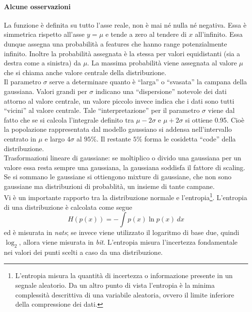 \paragraph{Alcune osservazioni}
La funzione è definita su tutto l’asse reale, non è mai né nulla né negativa. Essa è simmetrica rispetto all’asse $y=\mu$  e tende a zero al tendere di $x$ all’infinito. Essa dunque assegna una probabilità a features che hanno range potenzialmente infinito. Inoltre la probabilità assegnata è la stessa per valori equidistanti (sia a destra come a sinistra) da $\mu$. La massima probabilità viene assegnata al valore $\mu$ che si chiama anche valore centrale della distribuzione.\\
Il parametro $\sigma$ serve a determinare quanto è “larga” o “svasata” la campana della gaussiana. Valori grandi per $\sigma$ indicano una “dispersione” notevole dei dati attorno al valore centrale, un valore piccolo invece indica che i dati sono tutti “vicini” al valore centrale. Tale “interpretazione” per il parametro $\sigma$ viene dal fatto che se si calcola l’integrale definito tra $\mu - 2\sigma$ e $\mu + 2\sigma$ si ottiene 0.95. Cioè la popolazione rappresentata dal modello gaussiano si addensa nell’intervallo centrato in $\mu$ e largo $4\sigma$ al $95\%$. Il restante $5\%$ forma le cosidetta “code” della distribuzione.\\

\noindent Trasformazioni lineare di gaussiane: se moltiplico o divido una gaussiana per un valore essa resta sempre una gaussiana, la gaussiana soddisfa il fattore di scaling. Se si sommano le gaussiane si ottiengono mixture di gaussiane, che non sono gaussiane ma distribuzioni di probablità, un insieme di tante campane.\\ 

\noindent Vi è un importante rapporto tra la distribuzione normale e l'entropia\footnote{L'entropia misura la quantità di incertezza o informazione presente in un segnale aleatorio. Da un altro punto di vista l'entropia è la minima complessità descrittiva di una variabile aleatoria, ovvero il limite inferiore della compressione dei dati.}. L'entropia di una distribuzione è calcolata come segue
\begin{equation}
H(p(x)) = - \int p(x) \ln p(x) \ dx
\end{equation}
ed è misurata in \emph{nats}; se invece viene utilizzato il logaritmo di base due, quindi $\log_2$, allora viene misurata in \emph{bit}. L'entropia misura l'incertezza fondamentale nei valori dei punti scelti a caso da una distribuzione.\\

